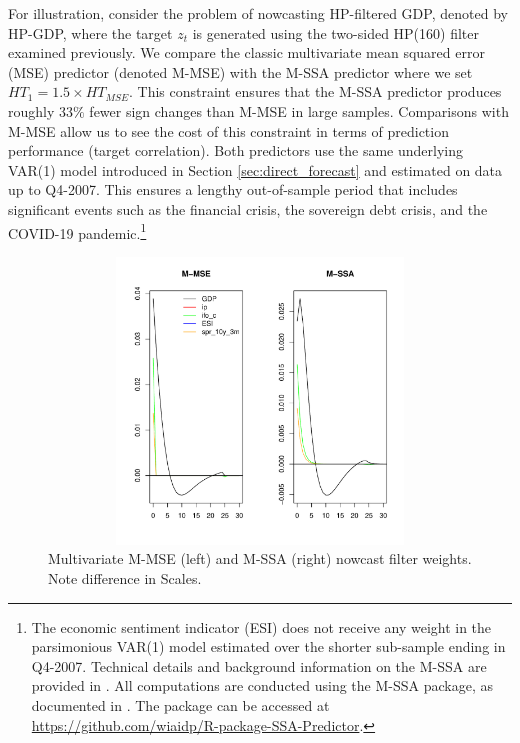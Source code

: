 \documentclass[11pt,a4paper]{article}
\begin{document}
For illustration, consider the problem of nowcasting HP-filtered GDP, denoted by HP-GDP, where the target $z_t$ is generated using the two-sided HP(160) filter examined previously. We compare the classic multivariate mean squared error (MSE) predictor (denoted M-MSE) with the M-SSA predictor where we set $HT_1=1.5\times HT_{MSE}$. This constraint ensures that the M-SSA predictor produces roughly 33$\%$ fewer sign changes than M-MSE in large samples. Comparisons with M-MSE allow us to see the cost of this constraint in terms of prediction performance (target correlation). 
Both predictors use the same underlying VAR(1) model introduced in Section \eqref{sec:direct_forecast} and estimated on data up to Q4-2007. This ensures a lengthy out-of-sample period that includes significant events such as the financial crisis, the sovereign debt crisis, and the COVID-19 pandemic.\footnote{The economic sentiment indicator (ESI) does not receive any weight in the parsimonious VAR(1) model estimated over the shorter sub-sample ending in Q4-2007. Technical details and background information on the M-SSA are provided in \cite{Wildi2025}. All computations are conducted using the M-SSA package, as documented in \cite{Wildi2025}. The package can be accessed at \url{https://github.com/wiaidp/R-package-SSA-Predictor}.}

\begin{figure}[htpb]
    \begin{center}
        \includegraphics[height=3in, width=4.5in]{./Figures/bk_gammak.pdf}
        \caption{Multivariate M-MSE (left) and M-SSA (right) nowcast filter weights.\\
        Note difference in Scales.
        \label{bk_gammak}}
    \end{center}
\end{figure}
\end{document}
